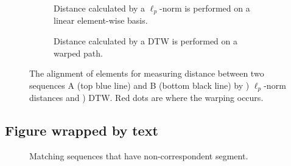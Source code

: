 \noindent
\begin{figure}[!h]
  \begin{subfigure}[b]{.5\linewidth}
    \raggedright\footnotesize
    \def\svgwidth{.95\linewidth}
    
    \caption{Distance calculated by a $\ell_p$-norm is performed on a linear element-wise basis.}
    \label{fig:fig3a}
  \end{subfigure}%
  \begin{subfigure}[b]{.5\linewidth}
    \raggedleft\footnotesize
    \def\svgwidth{.95\linewidth}
    
    \caption{Distance calculated by a DTW is performed on a warped path.}
    \label{fig:fig3b}
  \end{subfigure}
  \caption[Illustration of $\ell_p$-norm distance and DTW distance]{The alignment of elements for measuring distance between two sequences A (top blue line) and B (bottom black line) by ) $\ell_p$-norm distances and ) DTW. Red dots are where the warping occurs.}
  \label{fig:fig3}
\end{figure}

\lipsum[3]

\subsection{Figure wrapped by text}
\begin{wrapfigure}{r}{.5\textwidth}
  \vspace{-20pt}
  \raggedright
  \footnotesize
  \def\svgwidth{\linewidth}
  
  \caption{Matching sequences that have non-correspondent segment.}
  \label{fig:fig4}
  \vspace{-10pt}
\end{wrapfigure}
%
\lipsum[2]

